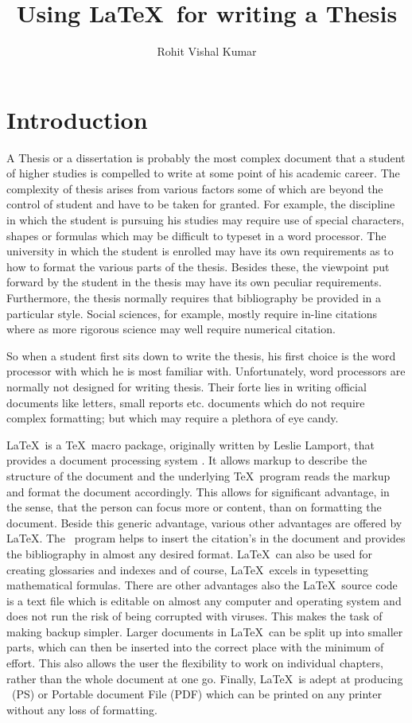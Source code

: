 \documentclass{pracjourn}
\title{Using \LaTeX\ for writing a Thesis}
\author{Rohit Vishal Kumar}
\begin{document}
\maketitle


\section{Introduction}

A Thesis or a dissertation is probably the most complex document that a student
of higher  studies is compelled to write at some point of his academic career.
The complexity of thesis arises from various factors some of which are beyond
the control of student and have to be taken for granted. For example, the
discipline in which the student is pursuing his studies may require use of
special characters, shapes or formulas which may be difficult to typeset in a
word processor. The university in which the student is enrolled may have its
own requirements as to how to format the various parts of the thesis. Besides
these, the viewpoint put forward by the student in the thesis may have its own
peculiar requirements. Furthermore, the thesis normally requires that
bibliography be provided in a particular style. Social sciences, for example,
mostly require in-line citations where as more rigorous science may well
require numerical citation.

So when a student first sits down to write the thesis, his first choice is the
word processor with which he  is most familiar with. Unfortunately, word
processors are normally not designed for writing thesis. Their forte lies in
writing official documents like letters, small reports etc. \dash documents
which do not require complex formatting; but which may require a plethora of
eye candy.

\LaTeX\ is a \TeX\ macro package, originally written by Leslie Lamport, that
provides a document  processing system \cite{LAMPORT}. It allows markup to
describe the structure of the document and the underlying \TeX\ program reads
the markup and format the document accordingly. This allows for significant
advantage, in the sense, that the person can focus more or content, than on
formatting the document. Beside this generic advantage, various other
advantages are offered by \LaTeX. The \BibTeX\ program helps to insert the
citation's in the document and provides the bibliography in almost any desired
format. \LaTeX\ can also be used for creating glossaries and indexes and of
course, \LaTeX\ excels in typesetting mathematical formulas. There are other
advantages also \dash the \LaTeX\ source code is a text file which is editable
on almost any computer and operating system and does not run the risk of being
corrupted with viruses. This makes the task of making backup simpler. Larger
documents in \LaTeX\ can be split up into smaller parts, which can then be
inserted into the correct place with the minimum of effort. This also allows
the user the flexibility to work on individual chapters, rather than the whole
document at one go. Finally, \LaTeX\ is adept at producing \PS\ (PS) or
Portable document File (PDF) \dash which can be printed on any printer without
any loss of formatting.
\end{document}

